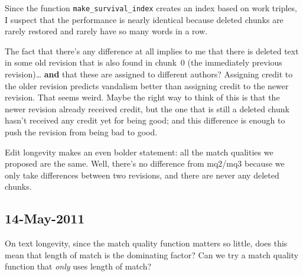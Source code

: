 Since the function \texttt{make\_survival\_index} creates
an index based on work triples, I suspect that the performance
is nearly identical because deleted chunks are rarely restored
and rarely have so many words in a row.

The fact that there's any difference at all implies to me
that there is deleted text in some old revision that is
also found in chunk~0 (the immediately previous revision)\ldots
\textbf{and} that these are assigned to different authors?
Assigning credit to the older revision predicts vandalism
better than assigning credit to the newer revision.
That seems weird.
Maybe the right way to think of this is that the newer revision
already received credit, but the one that is still a deleted
chunk hasn't received any credit yet for being good;
and this difference is enough to push the revision from
being bad to good.

Edit longevity makes an even bolder statement: all the
match qualities we proposed are the same.
Well, there's no difference from mq2/mq3 because we only
take differences between two revisions, and there are never
any deleted chunks.

\subsection{14-May-2011}

On text longevity, since the match quality function matters so little,
does this mean that length of match is the dominating factor?
Can we try a match quality function that \textit{only} uses
length of match?

